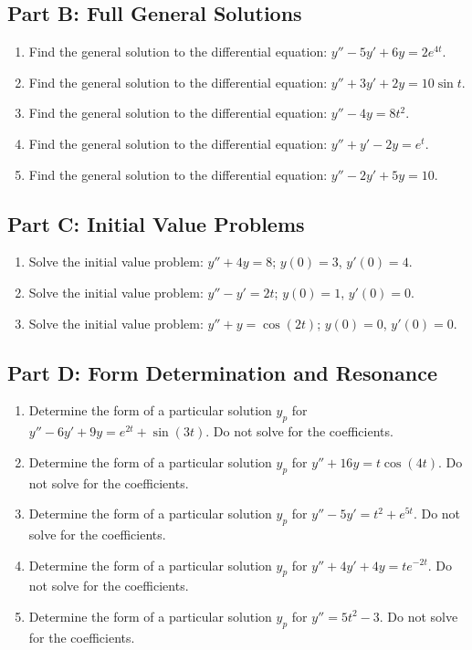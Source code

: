 \documentclass[11pt]{article}
\begin{document}
\subsection*{Part B: Full General Solutions}
\begin{enumerate}[resume]
    \item Find the general solution to the differential equation: $y'' - 5y' + 6y = 2e^{4t}$.
    \item Find the general solution to the differential equation: $y'' + 3y' + 2y = 10\sin t$.
    \item Find the general solution to the differential equation: $y'' - 4y = 8t^2$.
    \item Find the general solution to the differential equation: $y'' + y' - 2y = e^t$.
    \item Find the general solution to the differential equation: $y'' - 2y' + 5y = 10$.
\end{enumerate}

\subsection*{Part C: Initial Value Problems}
\begin{enumerate}[resume]
    \item Solve the initial value problem: $y'' + 4y = 8$; $y(0) = 3$, $y'(0) = 4$.
    \item Solve the initial value problem: $y'' - y' = 2t$; $y(0) = 1$, $y'(0) = 0$.
    \item Solve the initial value problem: $y'' + y = \cos(2t)$; $y(0) = 0$, $y'(0) = 0$.
\end{enumerate}

\subsection*{Part D: Form Determination and Resonance}
\begin{enumerate}[resume]
    \item Determine the form of a particular solution $y_p$ for $y'' - 6y' + 9y = e^{2t} + \sin(3t)$. Do not solve for the coefficients.
    \item Determine the form of a particular solution $y_p$ for $y'' + 16y = t\cos(4t)$. Do not solve for the coefficients.
    \item Determine the form of a particular solution $y_p$ for $y'' - 5y' = t^2 + e^{5t}$. Do not solve for the coefficients.
    \item Determine the form of a particular solution $y_p$ for $y'' + 4y' + 4y = t e^{-2t}$. Do not solve for the coefficients.
    \item Determine the form of a particular solution $y_p$ for $y'' = 5t^2 - 3$. Do not solve for the coefficients.
\end{enumerate}
\end{document}
